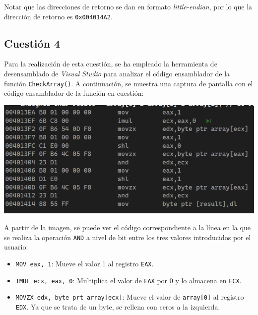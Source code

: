 \documentclass[11pt,a4paper]{article}
\begin{document}
\noindent Notar que las direcciones de retorno se dan en formato \textit{little-endian}, por lo que la dirección de retorno es \texttt{0x004014A2}. \vspace{3ex}
\vspace{3ex}

\subsection{Cuestión 4}
Para la realización de esta cuestión, se ha empleado la herramienta de desensamblado de \textit{Visual Studio} para analizar el código ensamblador de la función \texttt{CheckArray()}. A continuación, se muestra una captura de pantalla con el código ensamblador de la función en cuestión: \vspace{2ex}
\begin{center}
  \includegraphics[width=1\textwidth]{codigoEnsambladorCheckArray.png}
\end{center}
\vspace{2ex}

\noindent A partir de la imagen, se puede ver el código correspondiente a la línea en la que se realiza la operación \texttt{AND} a nivel de bit entre los tres valores introducidos por el usuario:
\begin{itemize}
  \item \texttt{MOV eax, 1}: Mueve el valor 1 al registro \texttt{EAX}.
  \item \texttt{IMUL ecx, eax, 0}: Multiplica el valor de \texttt{EAX} por 0 y lo almacena en \texttt{ECX}.
  \item \texttt{MOVZX edx, byte prt array[ecx]}: Mueve el valor de \texttt{array[0]} al registro \texttt{EDX}. Ya que se trata de un byte, se rellena con ceros a la izquierda.
\end{itemize}

\vspace{3ex}

\vspace{3ex}
\end{document}
